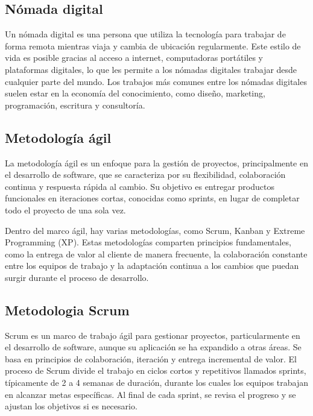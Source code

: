 
\subsection{Nómada digital}

 Un nómada digital es una persona que utiliza la tecnología para trabajar de forma remota mientras viaja y cambia de ubicación regularmente. Este estilo de vida es posible gracias al acceso a internet, computadoras portátiles y plataformas digitales, lo que les permite a los nómadas digitales trabajar desde cualquier parte del mundo. Los trabajos más comunes entre los nómadas digitales suelen estar en la economía del conocimiento, como diseño, marketing, programación, escritura y consultoría.\cite{NomDig}

\subsection{Metodología ágil}

La metodología ágil es un enfoque para la gestión de proyectos, principalmente en el desarrollo de software, que se caracteriza por su flexibilidad, colaboración continua y respuesta rápida al cambio. Su objetivo es entregar productos funcionales en iteraciones cortas, conocidas como sprints, en lugar de completar todo el proyecto de una sola vez. 

Dentro del marco ágil, hay varias metodologías, como Scrum, Kanban y Extreme Programming (XP). Estas metodologías comparten principios fundamentales, como la entrega de valor al cliente de manera frecuente, la colaboración constante entre los equipos de trabajo y la adaptación continua a los cambios que puedan surgir durante el proceso de desarrollo. \cite{MetAgil}

\subsection{Metodologia Scrum }

Scrum es un marco de trabajo ágil para gestionar proyectos, particularmente en el desarrollo de software, aunque su aplicación se ha expandido a otras áreas. Se basa en principios de colaboración, iteración y entrega incremental de valor. El proceso de Scrum divide el trabajo en ciclos cortos y repetitivos llamados sprints, típicamente de 2 a 4 semanas de duración, durante los cuales los equipos trabajan en alcanzar metas específicas. Al final de cada sprint, se revisa el progreso y se ajustan los objetivos si es necesario.\cite{Scrum}

